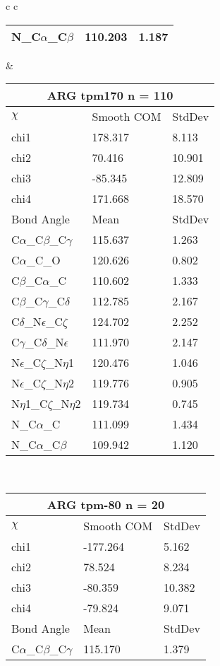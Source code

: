 \begin{longtable}{ c c }
\begin{tabular}{ l l l }
  N\_C$\alpha$\_C$\beta$ & 110.203 & 1.187\\
  \bottomrule
  \end{tabular}
  &
  \begin{tabular}{ l l l }
  \toprule
  \multicolumn{3}{c}{ARG \textbf{tpm170} n = 110} \\ \toprule
  $\chi$       & Smooth COM & StdDev \\ \midrule
  chi1 & 178.317 & 8.113 \\ 
  chi2 & 70.416 & 10.901 \\ 
  chi3 & -85.345 & 12.809 \\ 
  chi4 & 171.668 & 18.570 \\ \midrule
  Bond Angle   & Mean     & StdDev \\ \midrule
  C$\alpha$\_C$\beta$\_C$\gamma$ & 115.637 & 1.263\\
  C$\alpha$\_C\_O & 120.626 & 0.802\\
  C$\beta$\_C$\alpha$\_C & 110.602 & 1.333\\
  C$\beta$\_C$\gamma$\_C$\delta$ & 112.785 & 2.167\\
  C$\delta$\_N$\epsilon$\_C$\zeta$ & 124.702 & 2.252\\
  C$\gamma$\_C$\delta$\_N$\epsilon$ & 111.970 & 2.147\\
  N$\epsilon$\_C$\zeta$\_N$\eta$1 & 120.476 & 1.046\\
  N$\epsilon$\_C$\zeta$\_N$\eta$2 & 119.776 & 0.905\\
  N$\eta$1\_C$\zeta$\_N$\eta$2 & 119.734 & 0.745\\
  N\_C$\alpha$\_C & 111.099 & 1.434\\
  N\_C$\alpha$\_C$\beta$ & 109.942 & 1.120\\
  \bottomrule
  \end{tabular}
  \\
  \begin{tabular}{ l l l }
  \toprule
  \multicolumn{3}{c}{ARG \textbf{tpm-80} n = 20} \\ \toprule
  $\chi$       & Smooth COM & StdDev \\ \midrule
  chi1 & -177.264 & 5.162 \\ 
  chi2 & 78.524 & 8.234 \\ 
  chi3 & -80.359 & 10.382 \\ 
  chi4 & -79.824 & 9.071 \\ \midrule
  Bond Angle   & Mean     & StdDev \\ \midrule
  C$\alpha$\_C$\beta$\_C$\gamma$ & 115.170 & 1.379\\

\end{tabular}
\end{longtable}
